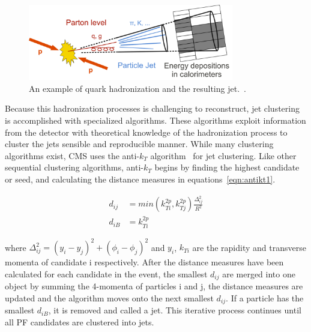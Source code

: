 \begin{figure}[hbtp]
 \begin{center}
   \includegraphics[width=0.8\textwidth]{ch4_figs/jet_frag.pdf}
   \caption[Jet hadronization example]{An example of quark hadronization and the resulting jet.~\cite{frag}.}
   \label{fig:frag}
 \end{center}
\end{figure}
 
Because this hadronization processes is challenging to reconstruct, jet clustering is accomplished with specialized algorithms. 
These algorithms exploit information from the detector with theoretical knowledge of the
hadronization process to cluster the jets sensible and reproducible manner.
While many clustering algorithms exist, CMS uses the anti-$k_{T}$ algorithm~\cite{antikt} for jet clustering.
Like other sequential clustering algorithms, anti-$k_{T}$ begins by finding the highest \pt candidate or seed, and
calculating the distance measures in equations~\ref{eqn:antikt1}. 

\begin{equation}
\begin{aligned}
\label{eqn:antikt1}
d_{ij} &= min(k^{2p}_{Ti},k^{2p}_{Tj})\frac{\Delta_{ij}^{2}}{R^{2}} \\ d_{iB} &= k^{2p}_{Ti}
\end{aligned} 
\end{equation}

\noindent where $\Delta_{ij}^{2} = (y_{i}-y_{j})^{2} + (\phi_{i}-\phi_{j})^{2}$ and $y_{i}$, $k_{Ti}$ are the rapidity and transverse
 momenta of candidate i respectively. After the distance measures have been calculated for each candidate in the event,
the smallest $d_{ij}$ are merged into one object by summing the 4-momenta of particles i and j, the
distance measures are updated and the algorithm moves onto the next smallest $d_{ij}$. If a particle has the smallest $d_{iB}$, it is removed and called a jet. This
iterative process continues until all PF candidates are clustered into jets.

